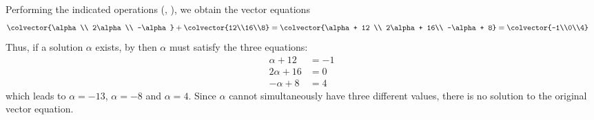 Performing the indicated operations (, ), we obtain the vector equations
\begin{align*}
\colvector{\alpha \\ 2\alpha\\ -\alpha} + \colvector{12\\16\\8} 
&=\colvector{\alpha + 12 \\ 2\alpha + 16\\ -\alpha + 8}
=\colvector{-1\\0\\4}
\end{align*}
Thus, if a solution $\alpha$ exists, by  then $\alpha$ must satisfy the three equations:
\begin{align*}
\alpha + 12 &= -1\\
2\alpha + 16 &= 0\\
-\alpha + 8 &= 4
\end{align*}
which leads to $\alpha = -13$, $\alpha = -8$ and $\alpha = 4$.  
Since $\alpha$ cannot simultaneously have three different values, there is no solution to the original vector equation. 